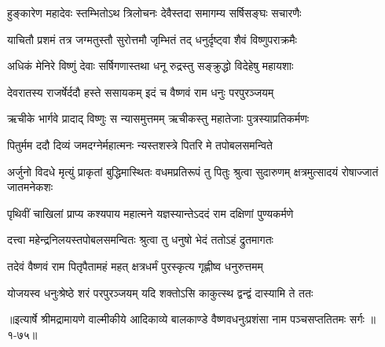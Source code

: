 \twolineshloka
{हुङ्कारेण महादेवः स्तम्भितोऽथ त्रिलोचनः}
{देवैस्तदा समागम्य सर्षिसङ्घः सचारणैः} %

\twolineshloka
{याचितौ प्रशमं तत्र जग्मतुस्तौ सुरोत्तमौ}
{जृम्भितं तद् धनुर्दृष्ट्वा शैवं विष्णुपराक्रमैः} %

\twolineshloka
{अधिकं मेनिरे विष्णुं देवाः सर्षिगणास्तथा}
{धनू रुद्रस्तु सङ्क्रुद्धो विदेहेषु महायशाः} %

\twolineshloka
{देवरातस्य राजर्षेर्ददौ हस्ते ससायकम्}
{इदं च वैष्णवं राम धनुः परपुरञ्जयम्} %

\twolineshloka
{ऋचीके भार्गवे प्रादाद् विष्णुः स न्यासमुत्तमम्}
{ऋचीकस्तु महातेजाः पुत्रस्याप्रतिकर्मणः} %

\twolineshloka
{पितुर्मम ददौ दिव्यं जमदग्नेर्महात्मनः}
{न्यस्तशस्त्रे पितरि मे तपोबलसमन्विते} %

\threelineshloka
{अर्जुनो विदधे मृत्युं प्राकृतां बुद्धिमास्थितः}
{वधमप्रतिरूपं तु पितुः श्रुत्वा सुदारुणम्}
{क्षत्रमुत्सादयं रोषाज्जातं जातमनेकशः} %

\twolineshloka
{पृथिवीं चाखिलां प्राप्य कश्यपाय महात्मने}
{यज्ञस्यान्तेऽददं राम दक्षिणां पुण्यकर्मणे} %

\twolineshloka
{दत्त्वा महेन्द्रनिलयस्तपोबलसमन्वितः}
{श्रुत्वा तु धनुषो भेदं ततोऽहं द्रुतमागतः} %

\twolineshloka
{तदेवं वैष्णवं राम पितृपैतामहं महत्}
{क्षत्रधर्मं पुरस्कृत्य गृह्णीष्व धनुरुत्तमम्} %

\twolineshloka
{योजयस्व धनुःश्रेष्ठे शरं परपुरञ्जयम्}
{यदि शक्तोऽसि काकुत्स्थ द्वन्द्वं दास्यामि ते ततः} %


॥इत्यार्षे श्रीमद्रामायणे वाल्मीकीये आदिकाव्ये बालकाण्डे वैष्णवधनुःप्रशंसा नाम पञ्चसप्ततितमः सर्गः ॥१-७५॥
